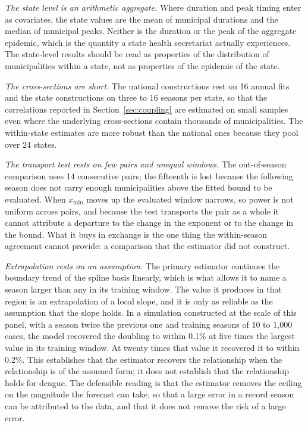 \documentclass[english,10pt,b5paper]{article}
\begin{document}
\emph{The state level is an arithmetic aggregate.} Where duration and peak timing
enter as covariates, the state values are the mean of municipal durations and the
median of municipal peaks. Neither is the duration or the peak of the aggregate
epidemic, which is the quantity a state health secretariat actually experiences. The
state-level results should be read as properties of the distribution of municipalities
within a state, not as properties of the epidemic of the state.

\emph{The cross-sections are short.} The national constructions rest on 16 annual
fits and the state constructions on three to 16 seasons per state, so that the
correlations reported in Section~\ref{sec:coupling} are estimated on small samples
even where the underlying cross-sections contain thousands of municipalities. The
within-state estimates are more robust than the national ones because they pool over
24 states.

\emph{The transport test rests on few pairs and unequal windows.} The out-of-season
comparison uses 14 consecutive pairs; the fifteenth is lost because the following
season does not carry enough municipalities above the fitted bound to be evaluated.
When $x_{\min}$ moves up the evaluated window narrows, so power is not uniform across
pairs, and because the test transports the pair as a whole it cannot attribute a
departure to the change in the exponent or to the change in the bound. What it buys
in exchange is the one thing the within-season agreement cannot provide: a
comparison that the estimator did not construct.

\emph{Extrapolation rests on an assumption.} The primary estimator continues
the boundary trend of the spline basis linearly, which is what allows it to
name a season larger than any in its training window. The value it produces in
that region is an extrapolation of a local slope, and it is only as reliable
as the assumption that the slope holds. In a simulation constructed at the
scale of this panel, with a season twice the previous one and training seasons
of 10 to 1{,}000 cases, the model recovered the doubling to within 0.1\% at
five times the largest value in its training window. At twenty times that
value it recovered it to within 0.2\%. This establishes that the estimator
recovers the relationship when the relationship is of the assumed form; it
does not establish that the relationship holds for dengue. The defensible
reading is that the estimator removes the ceiling on the magnitude the
forecast can take, so that a large error in a record season can be attributed
to the data, and that it does not remove the risk of a large error.
\end{document}

